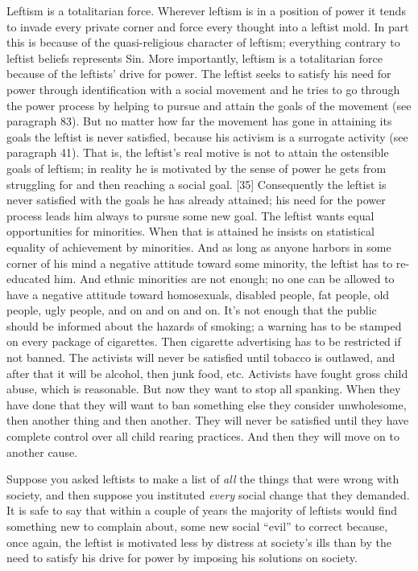  Leftism is a totalitarian force. Wherever leftism is in a position of power it tends to invade every private corner and force every thought into a leftist mold. In part this is because of the quasi-religious character of leftism; everything contrary to leftist beliefs represents Sin. More importantly, leftism is a totalitarian force because of the leftists’ drive for power. The leftist seeks to satisfy his need for power through identification with a social movement and he tries to go through the power process by helping to pursue and attain the goals of the movement (see paragraph 83). But no matter how far the movement has gone in attaining its goals the leftist is never satisfied, because his activism is a surrogate activity (see paragraph 41). That is, the leftist’s real motive is not to attain the ostensible goals of leftism; in reality he is motivated by the sense of power he gets from struggling for and then reaching a social goal. [35] Consequently the leftist is never satisfied with the goals he has already attained; his need for the power process leads him always to pursue some new goal. The leftist wants equal opportunities for minorities. When that is attained he insists on statistical equality of achievement by minorities. And as long as anyone harbors in some corner of his mind a negative attitude toward some minority, the leftist has to re-educated him. And ethnic minorities are not enough; no one can be allowed to have a negative attitude toward homosexuals, disabled people, fat people, old people, ugly people, and on and on and on. It’s not enough that the public should be informed about the hazards of smoking; a warning has to be stamped on every package of cigarettes. Then cigarette advertising has to be restricted if not banned. The activists will never be satisfied until tobacco is outlawed, and after that it will be alcohol, then junk food, etc. Activists have fought gross child abuse, which is reasonable. But now they want to stop all spanking. When they have done that they will want to ban something else they consider unwholesome, then another thing and then another. They will never be satisfied until they have complete control over all child rearing practices. And then they will move on to another cause.

 Suppose you asked leftists to make a list of {\em all} the things that were wrong with society, and then suppose you instituted {\em every} social change that they demanded. It is safe to say that within a couple of years the majority of leftists would find something new to complain about, some new social “evil” to correct because, once again, the leftist is motivated less by distress at society’s ills than by the need to satisfy his drive for power by imposing his solutions on society.

